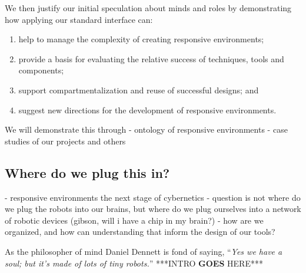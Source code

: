 We then justify our initial speculation about minds and roles by demonstrating how applying our standard interface can:

\begin{enumerate}
\item help to manage the complexity of creating responsive environments;
\item provide a basis for evaluating the relative success of techniques, tools and components;
\item support compartmentalization and reuse of successful designs; and
\item suggest new directions for the development of responsive environments.
\end{enumerate}

We will demonstrate this through
- ontology of responsive environments
- case studies of our projects and others

\subsection{Where do we plug this in?}
%
- responsive environments the next stage of cybernetics
- question is not where do we plug the robots into our brains, but where do we plug ourselves into a network of robotic devices (gibson, will i have a chip in my brain?)
- how are we organized, and how can understanding that inform the design of our tools?

As the philosopher of mind Daniel Dennett is fond of saying, ``\emph{Yes we have a soul; but it's made of lots of tiny robots.}'' \citeyearpar[p. 1]{freedom_evolves}
% 
***INTRO {\bf GOES} HERE*** \citep{society_of_mind}


